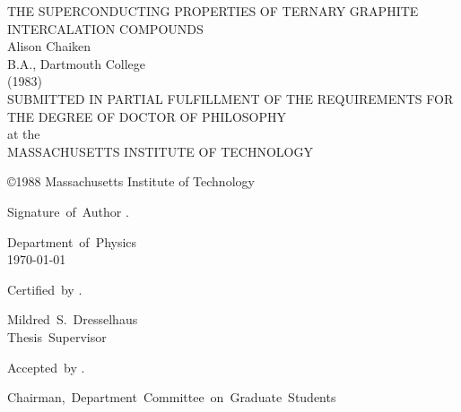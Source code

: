 \begin{center}
\begin{large}
THE SUPERCONDUCTING PROPERTIES OF TERNARY GRAPHITE INTERCALATION COMPOUNDS\\
\vspace{0.5in}
Alison Chaiken\\
\bigskip
B.A., Dartmouth College\\
(1983)\\
\bigskip
SUBMITTED IN PARTIAL FULFILLMENT OF THE REQUIREMENTS FOR THE DEGREE OF
DOCTOR OF PHILOSOPHY\\
\medskip
at the\\
\medskip
MASSACHUSETTS INSTITUTE OF TECHNOLOGY\\
\end{large}
\medskip
\medskip
\copyright 1988 Massachusetts Institute of Technology\\
\end{center}
\vfill
\begin{flushleft}
\mbox{Signature of Author} \dotfill . 
\end{flushleft}
\begin{flushright}
\mbox{Department of Physics}\\
\today
\end{flushright}
\begin{flushleft}
\mbox{Certified by} \dotfill . \\
\end{flushleft}
\begin{flushright}
\mbox{Mildred S. Dresselhaus}\\
\mbox{Thesis Supervisor}\\
\end{flushright}
\begin{flushleft}
\mbox{Accepted by} \dotfill . \\
\end{flushleft}
\begin{flushright}
\mbox{Chairman, Department Committee on Graduate Students}
\end{flushright}
\clearpage
